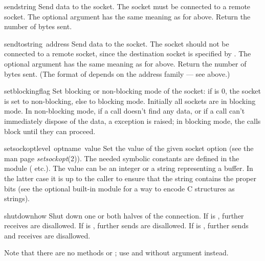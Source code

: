 \begin{funcdesc}{send}{string}
Send data to the socket.  The socket must be connected to a remote
socket.  The optional  argument has the same meaning as for
 above.  Return the number of bytes sent.
\end{funcdesc}

\begin{funcdesc}{sendto}{string\, address}
Send data to the socket.  The socket should not be connected to a
remote socket, since the destination socket is specified by
.  The optional  argument has the same
meaning as for  above.  Return the number of bytes sent.
(The format of  depends on the address family --- see above.)
\end{funcdesc}

\begin{funcdesc}{setblocking}{flag}
Set blocking or non-blocking mode of the socket: if  is 0,
the socket is set to non-blocking, else to blocking mode.  Initially
all sockets are in blocking mode.  In non-blocking mode, if a
 call doesn't find any data, or if a  call can't
immediately dispose of the data, a  exception is
raised; in blocking mode, the calls block until they can proceed.
\end{funcdesc}

\begin{funcdesc}{setsockopt}{level\, optname\, value}
Set the value of the given socket option (see the \UNIX{} man page
\emph{setsockopt}(2)).  The needed symbolic constants are defined in
the  module ( etc.).  The value can be an
integer or a string representing a buffer.  In the latter case it is
up to the caller to ensure that the string contains the proper bits
(see the optional built-in module
 for a way to encode C structures as strings).
\end{funcdesc}

\begin{funcdesc}{shutdown}{how}
Shut down one or both halves of the connection.  If  is ,
further receives are disallowed.  If  is , further sends are
disallowed.  If  is , further sends and receives are
disallowed.
\end{funcdesc}

Note that there are no methods  or ; use
 and  without  argument instead.

